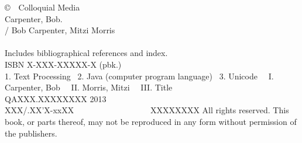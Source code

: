 \clearpage
\pagestyle{empty}
\vspace*{1.25in}
\noindent
{\footnotesize%
\copyright \ \ Colloquial Media
\hfill
\vfill
\vfill
{}
\\[6pt]
Carpenter, Bob.
\\
\hspace*{0.125in}{\it Text Processing with Java} / Bob
Carpenter, Mitzi Morris
\\
\hspace*{.5in}{p. cm.}
\\
\hspace*{0.125in}Includes bibliographical references and index.
\\
\hspace*{0.125in}ISBN X-XXX-XXXXX-X (pbk.)
\\[4pt]
1. Text Processing  \ 2. Java (computer program language) \ 3. Unicode
\ \ I. Carpenter, Bob \ \ II. Morris, Mitzi \ \  III. Title
\\[2pt]
\hspace*{0.125in}QAXXX.XXXXXXXX 2013
\\[2pt]
\hspace*{0.125in}XXX/.XX'X-xxXX      \ \ \ \ \ \ \ \ \ \ \ \ \ \ \ \ \  \ XXXXXXXX
\vfill
All rights reserved. This book, or parts thereof, may not
be reproduced in any form without permission of the publishers.
}

